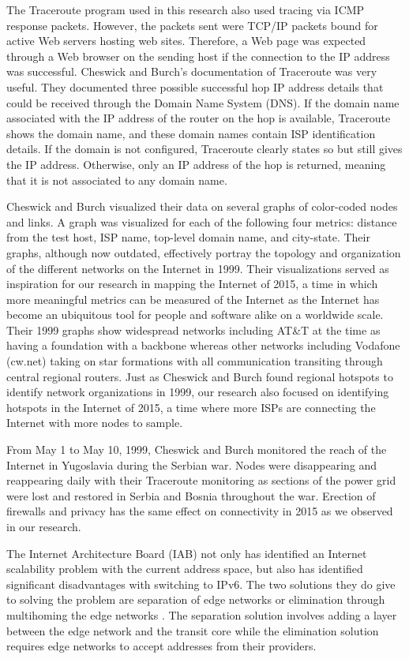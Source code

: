 \documentclass{sigcomm-alternate}
\begin{document}
The Traceroute program used in this research also used tracing via ICMP response packets. However, the packets sent were TCP/IP packets bound for active Web servers hosting web sites. Therefore, a Web page was expected through a Web browser on the sending host if the connection to the IP address was successful. Cheswick and Burch’s documentation of Traceroute was very useful. They documented three possible successful hop IP address details that could be received through the Domain Name System (DNS). If the domain name associated with the IP address of the router on the hop is available, Traceroute shows the domain name, and these domain names contain ISP identification details. If the domain is not configured, Traceroute clearly states so but still gives the IP address. Otherwise, only an IP address of the hop is returned, meaning that it is not associated to any domain name.

Cheswick and Burch visualized their data on several graphs of color-coded nodes and links. A graph was visualized for each of the following four metrics: distance from the test host, ISP name, top-level domain name, and city-state. Their graphs, although now outdated, effectively portray the topology and organization of the different networks on the Internet in 1999. Their visualizations served as inspiration for our research in mapping the Internet of 2015, a time in which more meaningful metrics can be measured of the Internet as the Internet has become an ubiquitous tool for people and software alike on a worldwide scale. Their 1999 graphs show widespread networks including AT&T at the time as having a foundation with a backbone whereas other networks including Vodafone (cw.net) taking on star formations with all communication transiting through central regional routers. Just as Cheswick and Burch found regional hotspots to identify network organizations in 1999, our research also focused on identifying hotspots in the Internet of 2015, a time where more ISPs are connecting the Internet with more nodes to sample. 

From May 1 to May 10, 1999, Cheswick and Burch monitored the reach of the Internet in Yugoslavia during the Serbian war. Nodes were disappearing and reappearing daily with their Traceroute monitoring as sections of the power grid were lost and restored in Serbia and Bosnia throughout the war. Erection of firewalls and privacy has the same effect on connectivity in 2015 as we observed in our research.

The Internet Architecture Board (IAB) not only has identified an Internet scalability problem with the current address space, but also has identified significant disadvantages with switching to IPv6. The two solutions they do give to solving the problem are separation of edge networks or elimination through multihoming the edge networks \cite{scalability}. The separation solution involves adding a layer between the edge network and the transit core while the elimination solution requires edge networks to accept addresses from their providers.
\end{document}
